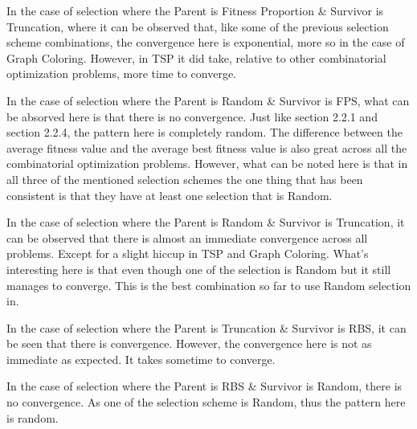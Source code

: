 \documentclass[11pt, letterpaper]{article}
\begin{document}
In the case of selection where the Parent is Fitness Proportion \& Survivor is Truncation, where it can be observed that, like some of the previous selection scheme combinations, the convergence here is exponential, more so in the case of Graph Coloring. However, in TSP it did take, relative to other combinatorial optimization problems, more time to converge.

In the case of selection where the Parent is Random \& Survivor is FPS, what can be absorved here is that there is no convergence. Just like section 2.2.1 and section 2.2.4, the pattern here is completely random. The difference between the average fitness value and the average best fitness value is also great across all the combinatorial optimization problems. However, what can be noted here is that in all three of the mentioned selection schemes the one thing that has been consistent is that they have at least one selection that is Random.

In the case of selection where the Parent is Random \& Survivor is Truncation, it can be observed that there is almost an immediate convergence across all problems. Except for a slight hiccup in TSP and Graph Coloring. What's interesting here is that even though one of the selection is Random but it still manages to converge. This is the best combination so far to use Random selection in.

In the case of selection where the Parent is Truncation \& Survivor is RBS, it can be seen that there is convergence. However, the convergence here is not as immediate as expected. It takes sometime to converge.

In the case of selection where the Parent is RBS \& Survivor is Random, there is no convergence. As one of the selection scheme is Random, thus the pattern here is random.
\end{document}
